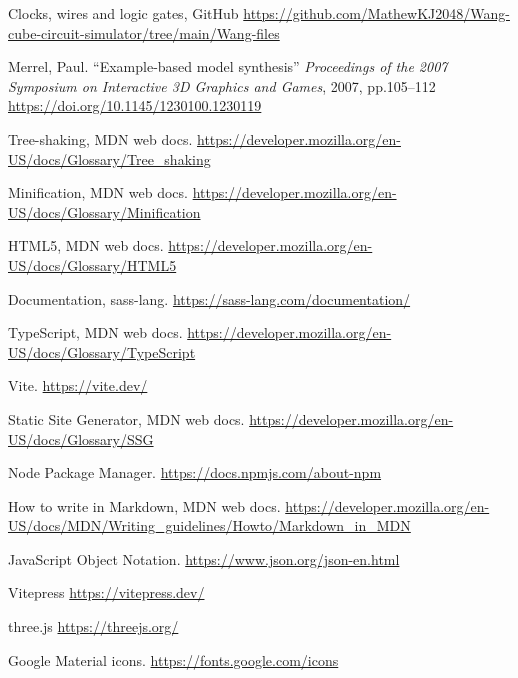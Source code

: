 \documentclass[letterpaper,11pt]{article}
\begin{document}
{\begin{thebibliography}{99}
 Clocks, wires and logic gates, GitHub \url{https://github.com/MathewKJ2048/Wang-cube-circuit-simulator/tree/main/Wang-files}

 Merrel, Paul. ``Example-based model synthesis'' \textit{Proceedings of the 2007 Symposium on Interactive 3D Graphics and Games}, 2007, pp.105--112 \url{https://doi.org/10.1145/1230100.1230119}

 Tree-shaking, MDN web docs. \url{https://developer.mozilla.org/en-US/docs/Glossary/Tree_shaking}

 Minification, MDN web docs. \url{https://developer.mozilla.org/en-US/docs/Glossary/Minification}

 HTML5,  MDN web docs. \url{https://developer.mozilla.org/en-US/docs/Glossary/HTML5}

 Documentation, sass-lang. \url{https://sass-lang.com/documentation/}

 TypeScript,  MDN web docs. \url{https://developer.mozilla.org/en-US/docs/Glossary/TypeScript}

 Vite. \url{https://vite.dev/}

 Static Site Generator, MDN web docs. \url{https://developer.mozilla.org/en-US/docs/Glossary/SSG}

 Node Package Manager. \url{https://docs.npmjs.com/about-npm}

 How to write in Markdown, MDN web docs. \url{https://developer.mozilla.org/en-US/docs/MDN/Writing_guidelines/Howto/Markdown_in_MDN}

 JavaScript Object Notation. \url{https://www.json.org/json-en.html}

 Vitepress \url{https://vitepress.dev/}

 three.js \url{https://threejs.org/}

 Google Material icons. \url{https://fonts.google.com/icons}



\end{thebibliography}
} %
   
\end{document}
